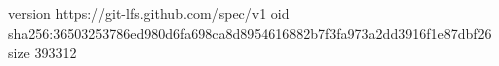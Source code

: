 version https://git-lfs.github.com/spec/v1
oid sha256:36503253786ed980d6fa698ca8d8954616882b7f3fa973a2dd3916f1e87dbf26
size 393312
